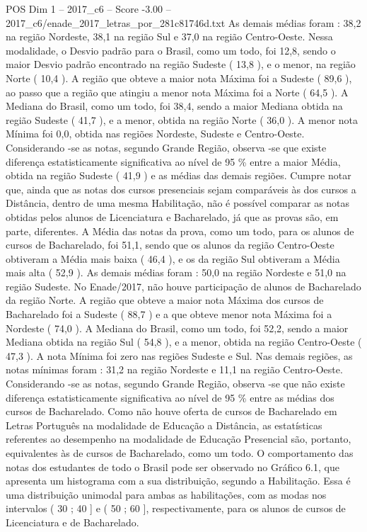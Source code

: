 \begin{textsample}{POS Dim 1 – 2017\_c6 – Score -3.00 – 2017\_c6/enade\_2017\_letras\_por\_281c81746d.txt}
As demais médias foram : 38,2 na região Nordeste, 38,1 na região Sul e 37,0 na região Centro-Oeste.
Nessa modalidade, o Desvio padrão para o Brasil, como um todo, foi 12,8, sendo o maior Desvio padrão encontrado na região Sudeste ( 13,8 ), e o menor, na região Norte ( 10,4 ).
A região que obteve a maior nota Máxima foi a Sudeste ( 89,6 ), ao passo que a região que atingiu a menor nota Máxima foi a Norte ( 64,5 ).
A Mediana do Brasil, como um todo, foi 38,4, sendo a maior Mediana obtida na região Sudeste ( 41,7 ), e a menor, obtida na região Norte ( 36,0 ).
A menor nota Mínima foi 0,0, obtida nas regiões Nordeste, Sudeste e Centro-Oeste.
Considerando -se as notas, segundo Grande Região, observa -se que existe diferença estatisticamente significativa ao nível de 95 \% entre a maior Média, obtida na região Sudeste ( 41,9 ) e as médias das demais regiões.
Cumpre notar que, ainda que as notas dos cursos presenciais sejam comparáveis às dos cursos a Distância, dentro de uma mesma Habilitação, não é possível comparar as notas obtidas pelos alunos de Licenciatura e Bacharelado, já que as provas são, em parte, diferentes.
A Média das notas da prova, como um todo, para os alunos de cursos de Bacharelado, foi 51,1, sendo que os alunos da região Centro-Oeste obtiveram a Média mais baixa ( 46,4 ), e os da região Sul obtiveram a Média mais alta ( 52,9 ).
As demais médias foram : 50,0 na região Nordeste e 51,0 na região Sudeste.
No Enade/2017, não houve participação de alunos de Bacharelado da região Norte.
A região que obteve a maior nota Máxima dos cursos de Bacharelado foi a Sudeste ( 88,7 ) e a que obteve menor nota Máxima foi a Nordeste ( 74,0 ).
A Mediana do Brasil, como um todo, foi 52,2, sendo a maior Mediana obtida na região Sul ( 54,8 ), e a menor, obtida na região Centro-Oeste ( 47,3 ).
A nota Mínima foi zero nas regiões Sudeste e Sul.
Nas demais regiões, as notas mínimas foram : 31,2 na região Nordeste e 11,1 na região Centro-Oeste.
Considerando -se as notas, segundo Grande Região, observa -se que não existe diferença estatisticamente significativa ao nível de 95 \% entre as médias dos cursos de Bacharelado.
Como não houve oferta de cursos de Bacharelado em Letras Português na modalidade de Educação a Distância, as estatísticas referentes ao desempenho na modalidade de Educação Presencial são, portanto, equivalentes às de cursos de Bacharelado, como um todo.
O comportamento das notas dos estudantes de todo o Brasil pode ser observado no Gráfico 6.1, que apresenta um histograma com a sua distribuição, segundo a Habilitação.
Essa é uma distribuição unimodal para ambas as habilitações, com as modas nos intervalos ( 30 ; 40 ] e ( 50 ; 60 ], respectivamente, para os alunos de cursos de Licenciatura e de Bacharelado.

\end{textsample}
